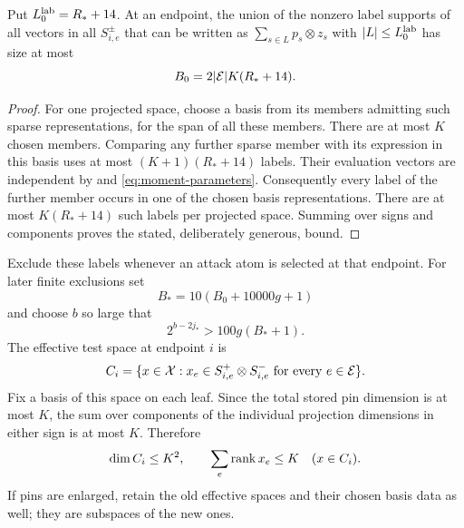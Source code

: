 \begin{lemma}\label{lem:sparse-pin-labels}
Put $L_0^{\rm lab}=R_*+14$.  At an endpoint, the union of the
nonzero label supports of all vectors in all $S_{i,e}^{\pm}$
that can be written as
$\sum_{s\in L}p_s\otimes z_s$ with $|L|\le L_0^{\rm lab}$
has size at most
\begin{equation}\label{eq:label-budget}
 B_0=2|\mathcal E|K(R_*+14).
\end{equation}
\end{lemma}
\begin{proof}
For one projected space, choose a basis from its members admitting
such sparse representations, for the span of all these members.
There are at most $K$ chosen members.  Comparing any further sparse
member with its expression in this basis uses at most
$(K+1)(R_*+14)$ labels.  Their evaluation vectors are independent
by  and \eqref{eq:moment-parameters}.
Consequently every label of the further member occurs in one of
the chosen basis representations.  There are at most
$K(R_*+14)$ such labels per projected space.  Summing over signs
and components proves the stated, deliberately generous, bound.
\end{proof}

Exclude these labels whenever an attack atom is selected at that
endpoint.  For later finite exclusions set
\[
 B_*=10(B_0+10000g+1)
\]
and choose $b$ so large that
\begin{equation}\label{eq:selector-size}
 2^{b-2j_*}>100g(B_*+1).
\end{equation}
The effective test space at endpoint $i$ is
\begin{equation}\label{eq:effective-space}
 C_i=\{x\in\mathcal X:x_e\in S_{i,e}^+\otimes S_{i,e}^-
                  \text{ for every }e\in\mathcal E\}.
\end{equation}
Fix a basis of this space on each leaf.  Since the total stored
pin dimension is at most $K$, the sum over components of the
individual projection dimensions in either sign is at most $K$.
Therefore
\begin{equation}\label{eq:effective-bounds}
 \dim C_i\le K^2,\qquad
 \sum_e\operatorname{rank} x_e\le K\quad(x\in C_i).
\end{equation}
If pins are enlarged, retain the old effective spaces and their
chosen basis data as well; they are subspaces of the new ones.

